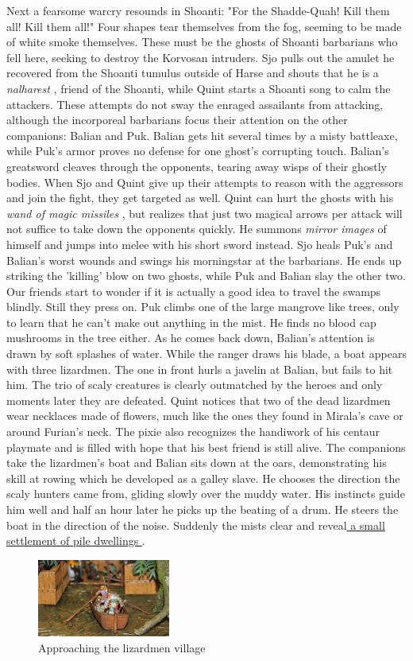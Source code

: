 Next a fearsome warcry resounds in Shoanti: "For the Shadde-Quah! Kill them all! Kill them all!" Four shapes tear themselves from the fog, seeming to be made of white smoke themselves. These must be the ghosts of Shoanti barbarians who fell here, seeking to destroy the Korvosan intruders. Sjo pulls out the amulet he recovered from the Shoanti tumulus outside of Harse and shouts that he is a {\itshape nalharest} , friend of the Shoanti, while Quint starts a Shoanti song to calm the attackers. These attempts do not sway the enraged assailants from attacking, although the incorporeal barbarians focus their attention on the other companions: Balian and Puk. Balian gets hit several times by a misty battleaxe, while Puk's armor proves no defense for one ghost's corrupting touch. Balian's greatsword cleaves through the opponents, tearing away wisps of their ghostly bodies. When Sjo and Quint give up their attempts to reason with the aggressors and join the fight, they get targeted as well. Quint can hurt the ghosts with his  {\itshape wand of magic missiles} , but realizes that just two magical arrows per attack will not suffice to take down the opponents quickly. He summons  {\itshape mirror images} of himself and jumps into melee with his short sword instead. Sjo heals Puk's and Balian's worst wounds and swings his morningstar at the barbarians. He ends up striking the 'killing' blow on two ghosts, while Puk and Balian slay the other two. Our friends start to wonder if it is actually a good idea to travel the swamps blindly. Still they press on. Puk climbs one of the large mangrove like trees, only to learn that he can't make out anything in the mist. He finds no blood cap mushrooms in the tree either. As he comes back down, Balian's attention is drawn by soft splashes of water. While the ranger draws his blade, a boat appears with three lizardmen. The one in front hurls a javelin at Balian, but fails to hit him. The trio of scaly creatures is clearly outmatched by the heroes and only moments later they are defeated. Quint notices that two of the dead lizardmen wear necklaces made of flowers, much like the ones they found in Mirala's cave or around Furian's neck. The pixie also recognizes the handiwork of his centaur playmate and is filled with hope that his best friend is still alive. The companions take the lizardmen's boat and Balian sits down at the oars, demonstrating his skill at rowing which he developed as a galley slave. He chooses the direction the scaly hunters came from, gliding slowly over the muddy water. His instincts guide him well and half an hour later he picks up the beating of a drum. He steers the boat in the direction of the noise. Suddenly the mists clear and reveal\hyperref[fig:Approaching-the-lizardmen-village-540871537]{ a small settlement of pile dwellings } . \\

\begin{figure}[h]
	\centering
	\includegraphics[width=0.39\textwidth]{images/Approaching-the-lizardmen-village-540871537.jpg}
	\caption{Approaching the lizardmen village}
	\label{fig:Approaching-the-lizardmen-village-540871537}
\end{figure}

